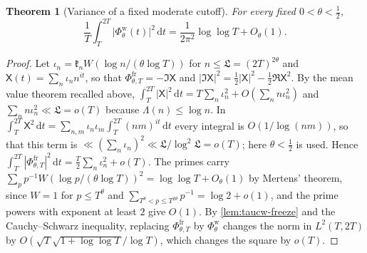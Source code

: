 \documentclass[11pt,a4paper]{article}
\numberwithin{equation}{section}
\newtheorem{theorem}{Theorem}[section]
\theoremstyle{definition}
\theoremstyle{remark}
\newcommand{\dd}{\,\mathrm dt}
\begin{document}
\begin{theorem}[Variance of a fixed moderate cutoff]\label{thm:taucw-var}
For every fixed $0<\theta<\frac12$,
\begin{equation}\label{eq:taucw-var}
\frac1T\int_T^{2T}\bigl|\Phi^{\mathrm w}_\theta(t)\bigr|^2\dd=\frac1{2\pi^2}\log\log T+O_\theta(1).
\end{equation}
\end{theorem}
\begin{proof}
Let $\iota_n=\mathfrak k_nW(\log n/(\theta\log T))$ for $n\le\mathfrak L=(2T)^{2\theta}$ and $\mathsf X(t)=\sum_n\iota_nn^{it}$, so that $\Phi^{\mathrm{fr}}_{\theta,T}=-\Im\mathsf X$ and $|\Im\mathsf X|^2=\frac12|\mathsf X|^2-\frac12\Re\mathsf X^2$. By the mean value theorem recalled above, $\int_T^{2T}|\mathsf X|^2\dd=T\sum_n\iota_n^2+O(\sum_nn\iota_n^2)$ and $\sum_nn\iota_n^2\ll\mathfrak L=o(T)$ because $\Lambda(n)\le\log n$. In $\int_T^{2T}\mathsf X^2\dd=\sum_{n,m}\iota_n\iota_m\int_T^{2T}(nm)^{it}\dd$ every integral is $O(1/\log(nm))$, so that this term is $\ll(\sum_n\iota_n)^2\ll\mathfrak L/\log^2\mathfrak L=o(T)$; here $\theta<\frac12$ is used. Hence $\int_T^{2T}|\Phi^{\mathrm{fr}}_{\theta,T}|^2\dd=\frac T2\sum_n\iota_n^2+o(T)$. The primes carry $\sum_pp^{-1}W(\log p/(\theta\log T))^2=\log\log T+O_\theta(1)$ by Mertens' theorem, since $W=1$ for $p\le T^\theta$ and $\sum_{T^\theta<p\le T^{2\theta}}p^{-1}=\log2+o(1)$, and the prime powers with exponent at least $2$ give $O(1)$. By \cref{lem:taucw-freeze} and the Cauchy--Schwarz inequality, replacing $\Phi^{\mathrm{fr}}_{\theta,T}$ by $\Phi^{\mathrm w}_\theta$ changes the norm in $L^2(T,2T)$ by $O(\sqrt{T}\sqrt{1+\log\log T}/\log T)$, which changes the square by $o(T)$.
\end{proof}
\end{document}
